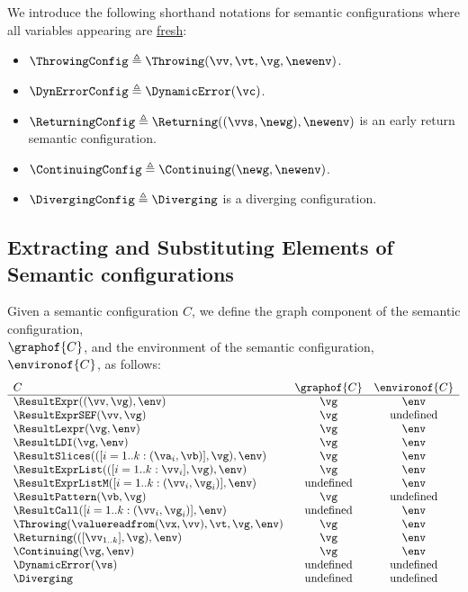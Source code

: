 We introduce the following shorthand notations for semantic configurations where all variables
appearing are \hyperlink{def-freshvariables}{fresh}:
\begin{itemize}
\hypertarget{def-throwingconfig}{}
\item $\ThrowingConfig \triangleq \Throwing(\vv, \vt, \vg, \newenv)$.
      \hypertarget{def-errorconfig}{}
\item $\DynErrorConfig \triangleq \DynamicError(\vc)$.
      \hypertarget{def-returningconfig}{}
\item $\ReturningConfig \triangleq \Returning((\vvs,\newg), \newenv)$
      is an early return semantic configuration.
\hypertarget{def-continuingconfig}{}
\item $\ContinuingConfig \triangleq \Continuing(\newg, \newenv)$.
      \hypertarget{def-divergingconfig}{}
\item $\DivergingConfig \triangleq \Diverging$ is a diverging configuration.
\end{itemize}

\subsection{Extracting and Substituting Elements of Semantic configurations}

\hypertarget{def-graphof}{}
\hypertarget{def-environof}{}
Given a semantic configuration $C$, we define the graph component of the semantic configuration, \\
$\graphof{C}$, and the environment of the semantic configuration, $\environof{C}$, as follows:
\[
\begin{array}{lcc}
  C & \graphof{C} & \environof{C}\\
  \hline
  \ResultExpr((\vv, \vg), \env) & \vg & \env\\
  \ResultExprSEF(\vv, \vg) & \vg & \text{undefined}\\
  \ResultLexpr(\vg, \env) & \vg & \env \\
  \ResultLDI(\vg, \env) & \vg & \env \\
  \ResultSlices(([i=1..k: (\va_i,\vb)], \vg), \env) & \vg & \env \\
  \ResultExprList(([i=1..k: \vv_i], \vg), \env) & \vg & \env \\
  \ResultExprListM([i=1..k: (\vv_i,\vg_i)], \env) & \text{undefined} & \env\\
  \ResultPattern(\vb, \vg) & \vg & \text{undefined}\\
  \ResultCall([i=1..k: (\vv_i,\vg_i)], \env) & \text{undefined} & \env\\
  \Throwing(\valuereadfrom(\vx,\vv),\vt,\vg, \env) & \vg & \env\\
  \Returning(([\vv_{1..k}],\vg), \env) & \vg & \env\\
  \Continuing(\vg, \env) & \vg & \env\\
  \DynamicError(\vs) & \text{undefined} & \text{undefined}\\
  \Diverging & \text{undefined} & \text{undefined}\\
\end{array}
\]

